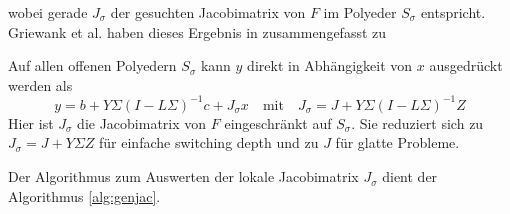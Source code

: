 wobei gerade $J_\sigma$ der gesuchten Jacobimatrix von $F$ im Polyeder $S_\sigma$ entspricht. 
Griewank et al. haben dieses Ergebnis in \cite[Proposition 2.2]{plan} zusammengefasst zu  
\begin{theorem}
Auf allen offenen Polyedern $S_\sigma$ kann $y$ direkt in Abhängigkeit von $x$ ausgedrückt werden als
\begin{equation}
y = b+Y\Sigma(I-L\Sigma)^{-1}c + J_\sigma x  \quad \text{mit} \quad J_\sigma = J+Y\Sigma(I-L\Sigma)^{-1} Z
\label{eq:explJacRepresentation}
\end{equation}
Hier ist $J_\sigma$ die Jacobimatrix von $F$ eingeschränkt auf $S_\sigma$. Sie reduziert sich zu $J_\sigma=J+Y\Sigma Z$ für einfache switching depth und zu $J$ für glatte Probleme.
\end{theorem}

Der Algorithmus zum Auswerten der lokale Jacobimatrix $J_\sigma$ dient der Algorithmus \ref{alg:genjac}.




